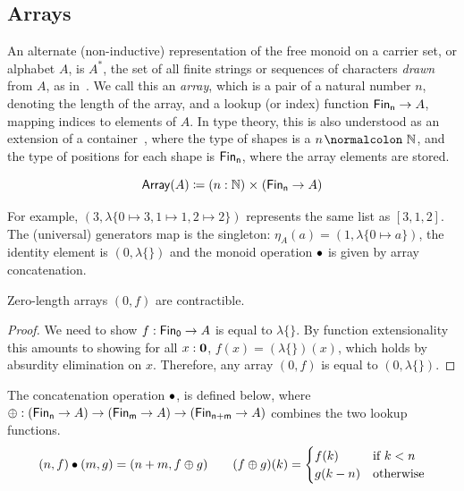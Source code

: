 \subsection{Arrays}
\label{sec:arrays}

An alternate (non-inductive) representation of the free monoid on a carrier set,
or alphabet $A$, is $A^{\ast}$,
the set of all finite strings or sequences of characters \emph{drawn} from $A$,
as in~\cite{dubucFreeMonoids1974}.
%
We call this an \emph{array},
which is a pair of a natural number $n$, denoting the length of the array,
and a lookup (or index) function $\Fin[n] \to A$, mapping indices to elements of $A$.
%
In type theory, this is also understood as an extension of a container~\cite{abbottCategoriesContainers2003},
where the type of shapes is a $n\colon\Nat$, and the type of positions for each shape is $\Fin[n]$,
where the array elements are stored.
%
\begin{definition}
    \label{def:arrays}
    \[
        \Array(A) \defeq \dsum{n : \Nat}{(\Fin[n] \to A)}
    \]
\end{definition}
%
For example, $(3, \lambda\{ 0 \mapsto 3, 1 \mapsto 1, 2 \mapsto 2 \})$
represents the same list as $[3, 1, 2]$.
%
The (universal) generators map is the singleton: $\eta_A(a) = (1, \lambda\{ 0 \mapsto a \})$,
the identity element is $(0, \lambda\{\})$
and the monoid operation $\mathbin{\bullet}$ is given by array concatenation.
%
\begin{toappendix}
    \begin{lemma}
        \label{array:zero-is-id}
        Zero-length arrays $(0, f)$ are contractible.
    \end{lemma}
    \begin{proof}
        We need to show $f : \Fin[0] \to A$ is equal to $\lambda\{\}$.
        By function extensionality this amounts to showing for all $x : {\mathbf{0}}$, $f(x) = (\lambda\{\})(x)$,
        which holds by absurdity elimination on $x$.
        Therefore, any array $(0, f)$ is equal to $(0, \lambda\{\})$.
    \end{proof}
\end{toappendix}
%
\begin{definition}
    The concatenation operation $\mathbin{\bullet}$, %
    is defined below, where $\oplus : (\Fin[n] \to A) \to (\Fin[m] \to A) \to (\Fin[n+m] \to\nolinebreak A)$
    combines the two lookup functions.
    \begin{gather*}
        (n , f) \mathbin{\bullet} (m , g) = (n + m , f \oplus g)
        \qquad
        (f \oplus g)(k)             = \begin{cases}
            f(k)     & \text{if}\ k < n \\
            g(k - n) & \text{otherwise}
        \end{cases}
    \end{gather*}
\end{definition}
